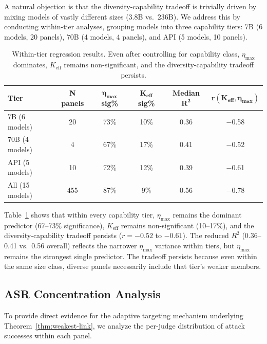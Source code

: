 \documentclass[11pt]{article}
\begin{document}
A natural objection is that the diversity-capability tradeoff is trivially driven by mixing models of vastly different sizes (3.8B vs.\ 236B). We address this by conducting within-tier analyses, grouping models into three capability tiers: 7B (6 models, 20 panels), 70B (4 models, 4 panels), and API (5 models, 10 panels).

\begin{table}[t]
\centering
\caption{Within-tier regression results. Even after controlling for capability class, $\eta_{\max}$ dominates, $K_{\text{eff}}$ remains non-significant, and the diversity-capability tradeoff persists.}
\label{tab:within-tier}
\small
\begin{tabular}{lccccc}
\toprule
\textbf{Tier} & \textbf{N panels} & $\boldsymbol{\eta_{\max}}$ \textbf{sig\%} & $\boldsymbol{K_{\text{eff}}}$ \textbf{sig\%} & \textbf{Median} $\boldsymbol{R^2}$ & $\boldsymbol{r(K_{\text{eff}}, \eta_{\max})}$ \\
\midrule
7B (6 models)   & 20  & 73\% & 10\% & 0.36 & $-$0.58 \\
70B (4 models)  & 4   & 67\% & 17\% & 0.41 & $-$0.52 \\
API (5 models)  & 10  & 72\% & 12\% & 0.39 & $-$0.61 \\
\midrule
All (15 models) & 455 & 87\% & 9\%  & 0.56 & $-$0.78 \\
\bottomrule
\end{tabular}
\end{table}

Table~\ref{tab:within-tier} shows that within every capability tier, $\eta_{\max}$ remains the dominant predictor (67--73\% significance), $K_{\text{eff}}$ remains non-significant (10--17\%), and the diversity-capability tradeoff persists ($r = -0.52$ to $-0.61$). The reduced $R^2$ (0.36--0.41 vs.\ 0.56 overall) reflects the narrower $\eta_{\max}$ variance within tiers, but $\eta_{\max}$ remains the strongest single predictor. The tradeoff persists because even within the same size class, diverse panels necessarily include that tier's weaker members.

\subsection{ASR Concentration Analysis}
\label{sec:concentration}

To provide direct evidence for the adaptive targeting mechanism underlying Theorem~\ref{thm:weakest-link}, we analyze the per-judge distribution of attack successes within each panel.
\end{document}
